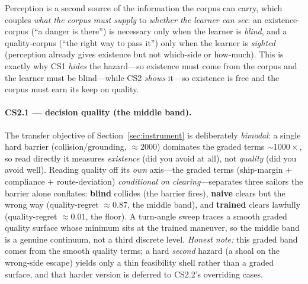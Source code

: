 \documentclass{article}
\begin{document}
Perception is a second source of the information the corpus can carry, which couples \emph{what the
corpus must supply} to \emph{whether the learner can see}: an existence-corpus (``a danger is there'')
is necessary only when the learner is \emph{blind}, and a quality-corpus (``the right way to pass it'')
only when the learner is \emph{sighted} (perception already gives existence but not which-side or
how-much). This is exactly why CS1 \emph{hides} the hazard---so existence must come from the corpus and
the learner must be blind---while CS2 \emph{shows} it---so existence is free and the corpus must earn
its keep on quality.

\paragraph{CS2.1 --- decision quality (the middle band).} The transfer objective of
Section~\ref{sec:instrument} is deliberately \emph{bimodal}: a single hard barrier (collision/grounding,
$\approx 2000$) dominates the graded terms $\sim\!1000\times$, so read directly it measures
\emph{existence} (did you avoid at all), not \emph{quality} (did you avoid well). Reading quality off
its \emph{own} axis---the graded terms (ship-margin $+$ compliance $+$ route-deviation) \emph{conditional
on clearing}---separates three sailors the barrier alone conflates: \textbf{blind} collides (the barrier
fires), \textbf{naive} clears but the wrong way (quality-regret $\approx 0.87$, the middle band), and
\textbf{trained} clears lawfully (quality-regret $\approx 0.01$, the floor). A turn-angle sweep traces a
smooth graded quality surface whose minimum sits at the trained maneuver, so the middle band is a genuine
continuum, not a third discrete level. \emph{Honest note:} this graded band comes from the smooth quality
terms; a hard \emph{second} hazard (a shoal on the wrong-side escape) yields only a thin feasibility shell
rather than a graded surface, and that harder version is deferred to CS2.2's overriding cases.
\end{document}
